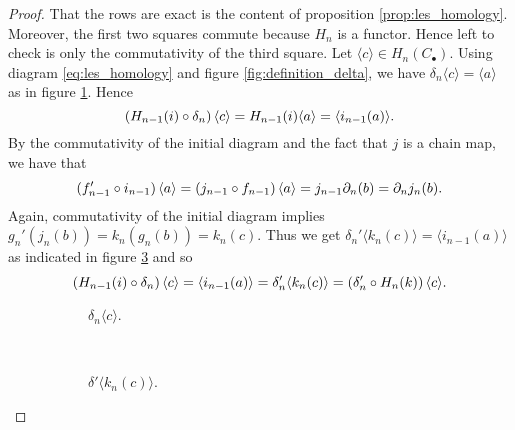 \begin{proof}
	That the rows are exact is the content of proposition \ref{prop:les_homology}. Moreover, the first two squares commute because $H_n$ is a functor. Hence left to check is only the commutativity of the third square. Let $\langle c \rangle \in H_n(C_\bullet)$. Using diagram \ref{eq:les_homology} and figure \ref{fig:definition_delta}, we have $\delta_n\langle c \rangle = \langle a \rangle$ as in figure \ref{fig:delta_n_c}. Hence
	\begin{equation*}
		\del[0]{H_{n - 1}(i) \circ \delta_n}\langle c \rangle = H_{n - 1}(i)\langle a \rangle = \langle i_{n - 1}(a)\rangle.
	\end{equation*}
	By the commutativity of the initial diagram and the fact that $j$ is a chain map, we have that
	\begin{equation*}
		\del[0]{f'_{n - 1} \circ i_{n - 1}}\langle a \rangle = \del[0]{j_{n - 1} \circ f_{n - 1}}\langle a \rangle = j_{n - 1}\partial_n(b) = \partial_nj_n(b).
	\end{equation*}
	Again, commutativity of the initial diagram implies $g_n'(j_n(b)) = k_n(g_n(b)) = k_n(c)$. Thus we get $\delta_n'\langle k_n(c)\rangle = \langle i_{n - 1}(a) \rangle$ as indicated in figure \ref{fig:delta_n_prime_k_c} and so
	\begin{equation*}
		\del[0]{H_{n - 1}(i) \circ \delta_n}\langle c \rangle = \langle i_{n - 1}(a)\rangle = \delta'_n \langle k_n(c) \rangle = \del[0]{\delta_n' \circ H_n(k)}\langle c \rangle.
	\end{equation*}
	\begin{figure}[h!tb]
		\centering
		\begin{subfigure}[b]{.5\textwidth}
			\centering
			\caption{$\delta_n\langle c \rangle$.}
			\label{fig:delta_n_c}
		\end{subfigure}
		~
		\begin{subfigure}[b]{.5\textwidth}
			\centering
			\caption{$\delta'\langle k_n(c) \rangle$.}
			\label{fig:delta_n_prime_k_c}					
		\end{subfigure}
		\caption{}
	\end{figure}
\end{proof}
